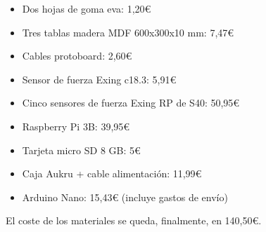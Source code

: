             \begin{itemize}
                \item Dos hojas de goma eva: 1,20\euro{}
                \item Tres tablas madera MDF 600x300x10 mm: 7,47\euro{}
                \item Cables protoboard: 2,60\euro{}
                \item Sensor de fuerza Exing c18.3: 5,91\euro{}
                \item Cinco sensores de fuerza Exing RP de S40: 50,95\euro{}
                \item Raspberry Pi 3B: 39,95\euro{}
                \item Tarjeta micro SD 8 GB: 5\euro{}
                \item Caja Aukru + cable alimentación: 11,99\euro{}
                \item Arduino Nano: 15,43\euro{} (incluye gastos de envío)
            \end{itemize}

            El coste de los materiales se queda, finalmente, en 140,50\euro{}.




\newpage
